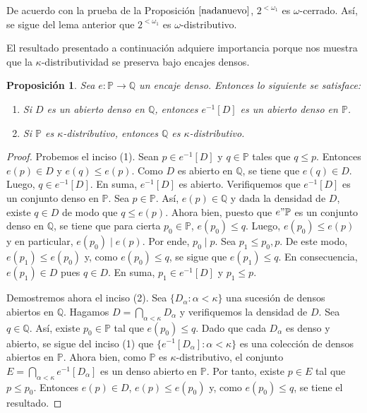 \documentclass[11pt]{unam_tesis1}
\theoremstyle{MyThmStyle}
\theoremstyle{definition}
\theoremstyle{plain}
\newtheorem{proposition}[definition]{Proposici\'on}
\theoremstyle{remark}
\let\leq\leqslant
\begin{document}
De acuerdo con la prueba de la Proposici\'on $\ref{nadanuevo}$, $2^{<\omega_1}$ es $\omega$-cerrado. As\'i, se sigue del lema anterior que $2^{<\omega_1}$ es $\omega$-distributivo.

El resultado presentado a continuaci\'on adquiere importancia porque nos muestra que la $\kappa$-distributividad se preserva bajo encajes densos.

\begin{proposition}
Sea $e:\mathbb P\to \mathbb Q$ un encaje denso. Entonces lo siguiente se satisface:
\begin{enumerate}
\item Si $D$ es un abierto denso en $\mathbb Q$, entonces $e^{-1}[D]$ es un abierto denso en $\mathbb P$.
\item Si $\mathbb P$ es $\kappa$-distributivo, entonces $\mathbb Q$ es $\kappa$-distributivo.
\end{enumerate}
\end{proposition}

\begin{proof}
Probemos el inciso (1). Sean $p\in e^{-1}[D]$ y $q\in \mathbb P$ tales que $q\leq p$. Entonces $e(p)\in D$ y $e(q)\leq e(p)$. Como $D$ es abierto en $\mathbb Q$, se tiene que $e(q)\in D$. Luego, $q\in e^{-1}[D]$. En suma, $e^{-1}[D]$ es abierto. Verifiquemos que $e^{-1}[D]$ es un conjunto denso en $\mathbb P$. Sea $p\in \mathbb P$. As\'i, $e(p)\in \mathbb Q$ y dada la densidad de $D$, existe $q\in D$ de modo que $q\leq e(p)$. Ahora bien, puesto que $e"\mathbb P$ es un conjunto denso en $\mathbb Q$, se tiene que para cierta $p_0\in\mathbb P$, $e(p_0)\leq q$. Luego, $e(p_0)\leq e(p)$ y en particular, $e(p_0)\mid e(p)$. Por ende, $p_0\mid p$. Sea $p_1\leq p_0,p$. De este modo, $e(p_1)\leq e(p_0)$ y, como $e(p_0)\leq q$, se sigue que $e(p_1)\leq q$. En consecuencia, $e(p_1)\in D$ pues $q\in D$. En suma, $p_1\in e^{-1}[D]$ y $p_1\leq p$.

Demostremos ahora el inciso (2). Sea $\{D_\alpha:\alpha<\kappa\}$ una sucesi\'on de densos abiertos en $\mathbb Q$. Hagamos $D=\bigcap_{\alpha<\kappa}D_\alpha$ y verifiquemos la densidad de $D$. Sea $q\in \mathbb Q$. As\'i, existe $p_0\in \mathbb P$ tal que $e(p_0)\leq q$. Dado que cada $D_\alpha$ es denso y abierto, se sigue del inciso (1) que $\{e^{-1}[D_\alpha]:\alpha<\kappa \}$ es una colecci\'on de densos abiertos en $\mathbb P$. Ahora bien, como $\mathbb P$ es $\kappa$-distributivo, el conjunto $E=\bigcap_{\alpha<\kappa}e^{-1}[D_\alpha]$ es un denso abierto en $\mathbb P$. Por tanto, existe $p\in E$ tal que $p\leq p_0$. Entonces $e(p)\in D$, $e(p)\leq e(p_0)$ y, como $e(p_0)\leq q$, se tiene el resultado.
\end{proof}
\end{document}
